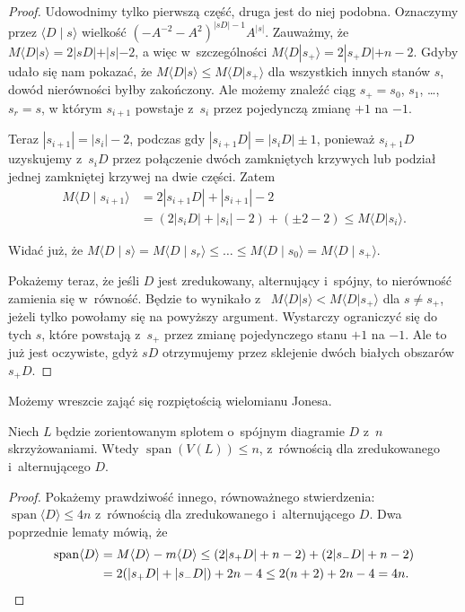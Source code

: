 \begin{proof}
    Udowodnimy tylko pierwszą część, druga jest do niej podobna.
    Oznaczymy przez $\langle D \mid s \rangle$ wielkość $(-A^{-2}-A^2)^{|sD|-1}A^{|s|}$.
    Zauważmy, że $M\langle D|s\rangle=2|sD|+|s|-2$,
    a więc w~szczególności $M\langle D|s_+\rangle=2|s_+D|+n-2$.
    Gdyby udało się nam pokazać, że $M\langle D|s\rangle \le M\langle D|s_+\rangle$
    dla wszystkich innych stanów $s$, dowód nierówności byłby zakończony.
    Ale możemy znaleźć ciąg $s_+ = s_0$, $s_1$, \ldots, $s_r=s$,
    w którym $s_{i+1}$ powstaje z~$s_i$ przez pojedynczą zmianę $+1$ na $-1$.

    Teraz $|s_{i+1}|=|s_i|-2$, podczas gdy $|s_{i+1}D|=|s_iD|\pm 1$,
    ponieważ $s_{i+1}D$ uzyskujemy z~$s_{i}D$ przez połączenie dwóch zamkniętych krzywych lub podział jednej zamkniętej krzywej na dwie części.
    Zatem
    \begin{align*}
        M \langle D \mid s_{i+1} \rangle & =
        2|s_{i+1}D|+|s_{i+1}|-2 \\ & =
        (2|s_iD| + |s_i| -2 ) + (\pm 2-2) \le
        M \langle D|s_i\rangle.
    \end{align*}

    Widać już, że $M\langle D \mid s\rangle =M\langle D \mid s_r\rangle \le\ldots\le M\langle D \mid s_0\rangle=M\langle D \mid s_+\rangle$.

    Pokażemy teraz, że jeśli $D$ jest zredukowany, alternujący i~spójny, to nierówność zamienia się w~równość.
    Będzie to wynikało z~ $M\langle D|s\rangle<M\langle D| s_+\rangle$
    dla $s\neq s_+$, jeżeli tylko powołamy się na powyższy argument.
    Wystarczy ograniczyć się do tych $s$, które powstają z~$s_+$ przez zmianę pojedynczego stanu $+1$ na $-1$.
    Ale to już jest oczywiste, gdyż $sD$ otrzymujemy przez sklejenie dwóch białych obszarów $s_+ D$.
\end{proof}

Możemy wreszcie zająć się rozpiętością wielomianu Jonesa.

\begin{proposition}
    Niech $L$ będzie zorientowanym splotem o~spójnym diagramie $D$ z~$n$ skrzyżowaniami.
    Wtedy $\operatorname{span}(V(L)) \le n$, z~równością dla zredukowanego i~alternującego $D$.
\end{proposition}

\begin{proof}
    Pokażemy prawdziwość innego, równoważnego stwierdzenia: $\operatorname{span} \langle D\rangle\le 4n$
    z~równością dla zredukowanego i~alternującego $D$.
    Dwa poprzednie lematy mówią, że
    \begin{align*}
        \operatorname{span}\langle D\rangle
        & = M\langle D\rangle - m\langle D\rangle \le (2|s_+D|+n-2)+(2|s_-D|+n-2) \\
        & = 2(|s_+D|+|s_- D|)+2n-4 \le 2(n+2)+2n-4 = 4n. \qedhere
    \end{align*}
\end{proof}

